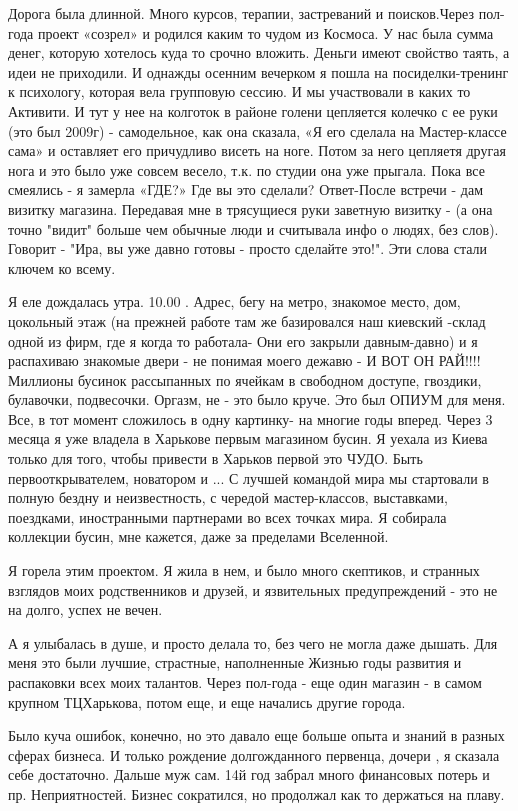 Дорога была длинной. Много курсов, терапии,  застреваний и поисков.Через
пол-года проект «созрел» и родился каким то чудом из Космоса. У  нас была сумма
денег, которую хотелось куда то срочно вложить. Деньги имеют свойство таять, а
идеи не приходили. И однажды осенним вечерком я пошла на посиделки-тренинг  к
психологу, которая вела групповую сессию.  И  мы участвовали в каких то
Активити. И тут у нее на колготок в районе голени цепляется колечко с ее руки
(это был 2009г) - самодельное, как она сказала, «Я его сделала на Мастер-классе
сама» и оставляет его причудливо висеть на ноге. Потом за него цепляетя другая
нога и это было уже совсем весело, т.к. по студии она уже прыгала. Пока все
смеялись - я замерла «ГДЕ?» Где вы это сделали? Ответ-После встречи - дам
визитку магазина. Передавая мне в трясущиеся руки заветную визитку - (а она
точно "видит" больше чем обычные люди и считывала инфо о людях, без слов).
Говорит - "Ира, вы уже давно готовы - просто сделайте это!". Эти слова стали
ключем ко всему. 

Я еле дождалась утра. 10.00 . Адрес, бегу на метро, знакомое место, дом,
цокольный этаж (на прежней работе там же базировался наш киевский -склад одной
из фирм, где я когда то работала-  Они его закрыли давным-давно) и я распахиваю
знакомые двери - не понимая моего дежавю - И ВОТ ОН РАЙ!!!! Миллионы бусинок
рассыпанных по ячейкам в свободном доступе, гвоздики, булавочки, подвесочки.
Оргазм, не - это было круче. Это был ОПИУМ для меня. Все, в тот момент
сложилось в одну картинку- на многие годы вперед. Через 3 месяца я уже владела
в Харькове первым магазином бусин. Я уехала из Киева только для того, чтобы
привести в Харьков первой это ЧУДО. Быть первооткрывателем, новатором и ... С
лучшей командой мира мы стартовали в полную бездну и неизвестность, с чередой
мастер-классов, выставками, поездками, иностранными партнерами во всех точках
мира. Я собирала коллекции бусин, мне кажется, даже за пределами Вселенной. 

Я горела этим проектом. Я жила в нем, и было много скептиков, и странных
взглядов моих родственников и друзей, и язвительных предупреждений - это не на
долго, успех не вечен.

А  я улыбалась в душе, и просто делала то, без чего не могла даже дышать.  Для
меня это были лучшие, страстные, наполненные Жизнью годы развития и распаковки
всех моих талантов. Через пол-года - еще один магазин  - в самом крупном
ТЦХарькова, потом еще, и  еще начались другие города. 

Было куча ошибок, конечно, но это давало еще больше опыта и знаний в разных
сферах бизнеса. И только рождение долгожданного первенца, дочери , я сказала
себе достаточно. Дальше муж сам. 14й год забрал много финансовых потерь и пр.
Неприятностей. Бизнес сократился, но продолжал как то держаться на плаву. 

